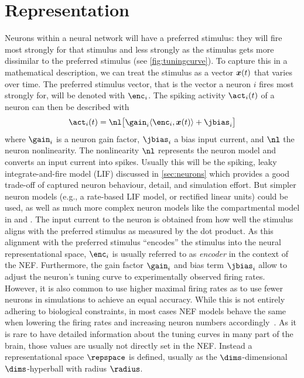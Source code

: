 \section{Representation}
Neurons within a neural network will have a preferred stimulus: they will fire most strongly for that stimulus and less strongly as the stimulus gets more dissimilar to the preferred stimulus (see \cref{fig:tuningcurve}).
To capture this in a mathematical description, we can treat the stimulus as a vector $\bm{x}(t)$ that varies over time.
The preferred stimulus vector, that is the vector a neuron $i$ fires most strongly for, will be denoted with $\enc_i$.
The spiking activity $\act_i(t)$ of a neuron can then be described with
\begin{equation}
    \act_i(t) = \nl\!\sbr{\gain_i \langle\enc_i, \vc x(t)\rangle + \jbias_i}
\end{equation}
where $\gain_i$ is a neuron gain factor, $\jbias_i$ a bias input current, and $\nl$ the neuron nonlinearity.
The nonlinearity $\nl$ represents the neuron model and converts an input current into spikes.
Usually this will be the spiking, leaky integrate-and-fire model (LIF) discussed in \cref{sec:neurons} which provides a good trade-off of captured neuron behaviour, detail, and simulation effort.
But simpler neuron models (e.g., a rate-based LIF model, or rectified linear units) could be used, as well as much more complex neuron models like the compartmental model in \textcite{eliasmith2016} and \textcite{duggins2017c}.
The input current to the neuron is obtained from how well the stimulus aligns with the preferred stimulus as measured by the dot product.
As this alignment with the preferred stimulus ``encodes'' the stimulus into the neural representational space, $\enc_i$ is usually referred to as \emph{encoder} in the context of the NEF\@.
Furthermore, the gain factor $\gain_i$ and bias term $\jbias_i$ allow to adjust the neuron's tuning curve to experimentally observed firing rates.
However, it is also common to use higher maximal firing rates as to use fewer neurons in simulations to achieve an equal accuracy.
While this is not entirely adhering to biological constraints, in most cases NEF models behave the same when lowering the firing rates and increasing neuron numbers accordingly~\parencite[e.g.,][]{gosmann2015}.
As it is rare to have detailed information about the tuning curves in many part of the brain, those values are usually not directly set in the NEF\@.
Instead a representational space $\repspace$ is defined, usually as the $\dims$-dimensional $\dims$-hyperball with radius $\radius$.
